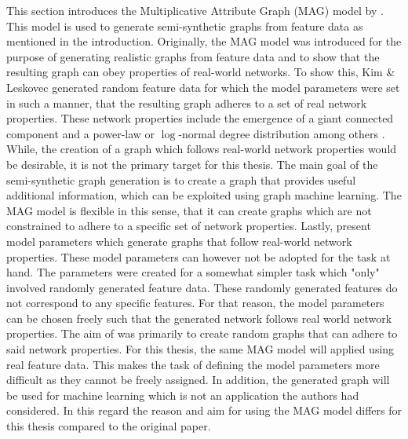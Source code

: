 	This section introduces the Multiplicative Attribute Graph (MAG) model by
	\cite{kim2012multiplicative}. This model is used to generate
	semi-synthetic graphs from feature data as mentioned in the introduction. 
	Originally, the MAG model was introduced for the purpose of generating 
	realistic graphs from feature data and to show that the resulting graph can 
	obey properties of real-world networks. To show this, Kim \& Leskovec 
	generated random feature data for which the model parameters were set in 
	such a manner, that the resulting graph adheres to a set of real network 
	properties. These network properties include the emergence of a giant
	connected component and a power-law or $\log$-normal degree distribution
	among others \citep[p. 113]{kim2012multiplicative}. While, the creation of a 
	graph which follows real-world network properties would be desirable, it is 
	not the primary target for this thesis. The main goal of the semi-synthetic 
	graph generation is to create a graph that provides useful additional 
	information, which can be exploited using graph machine learning. The MAG 
	model is flexible in this sense, that it can create graphs which are not 
	constrained to adhere to a specific set of network properties. Lastly, 
	\citeauthor{kim2012multiplicative} 
	\citeyearpar[p. 138-139]{kim2012multiplicative} present model parameters 
	which generate graphs that follow real-world network properties. These model 
	parameters can however not be adopted for the task at hand. The parameters 
	were created for a somewhat simpler task which "only" involved randomly 
	generated feature data. These randomly generated features do not correspond
	to any specific features. For that reason, the model parameters can be
	chosen freely such that the generated network follows real world network
	properties. The aim of \citeauthor{kim2012multiplicative} was primarily to
	create random graphs that can adhere to said network properties. For this
	thesis, the same MAG model will applied using real feature data. This makes
	the task of defining the model parameters more difficult as they cannot be
	freely assigned. In addition, the generated graph will be used for machine
	learning which is not an application the authors had considered. In this 
	regard the reason and aim for using the MAG model differs for this thesis 
	compared to the original paper. \\

